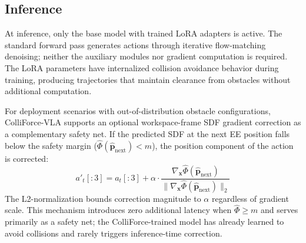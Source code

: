 \subsection{Inference}\label{sec:inference}

At inference, only the base model with trained LoRA adapters is active. The standard forward pass generates actions through iterative flow-matching denoising; neither the auxiliary modules nor gradient computation is required. The LoRA parameters have internalized collision avoidance behavior during training, producing trajectories that maintain clearance from obstacles without additional computation.

For deployment scenarios with out-of-distribution obstacle configurations, ColliForce-VLA supports an optional workspace-frame SDF gradient correction as a complementary safety net. If the predicted SDF at the next EE position falls below the safety margin ($\hat{\Phi}(\hat{\mathbf{p}}_\mathrm{next}) < m$), the position component of the action is corrected:
\begin{equation}\label{eq:inference_correction}
a'_t[:3] = a_t[:3] + \alpha \cdot \frac{\nabla_{\mathbf{x}} \hat{\Phi}(\hat{\mathbf{p}}_\mathrm{next})}{\|\nabla_{\mathbf{x}} \hat{\Phi}(\hat{\mathbf{p}}_\mathrm{next})\|_2}
\end{equation}
The L2-normalization bounds correction magnitude to $\alpha$ regardless of gradient scale. This mechanism introduces zero additional latency when $\hat{\Phi} \geq m$ and serves primarily as a safety net; the ColliForce-trained model has already learned to avoid collisions and rarely triggers inference-time correction.
